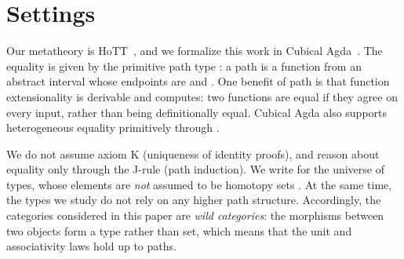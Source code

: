 \section{Settings}
\label{sec:settings}

Our metatheory is HoTT~\cite{HoTTBook}, and we formalize this work in Cubical Agda~\cite{Norell07,VezzosiMA19}. The equality \;\; is given by the primitive path type : a path is a function from an abstract interval whose endpoints are  and . One benefit of path is that function extensionality  is derivable and computes: two functions are equal if they agree on every input, rather than being definitionally equal. Cubical Agda also supports heterogeneous equality primitively through .

We do not assume axiom K (uniqueness of identity proofs), and reason about equality only through the J-rule (path induction). We write  for the universe of types, whose elements are \emph{not} assumed to be homotopy sets . At the same time, the types we study do not rely on any higher path structure. Accordingly, the categories considered in this paper are \emph{wild categories}: the morphisms between two objects form a type rather than set, which means that the unit and associativity laws hold up to paths.
